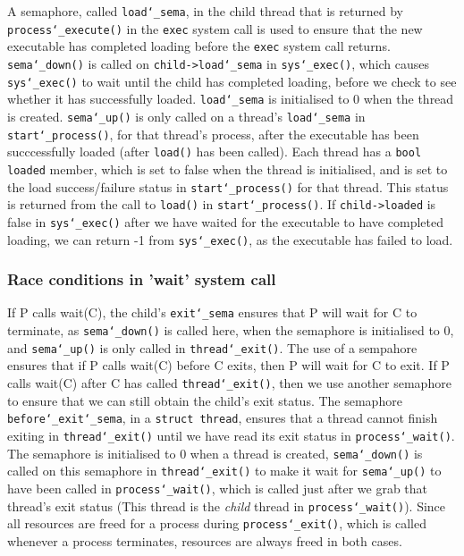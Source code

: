 \documentclass{article}
\renewcommand{\_}{\char`_}
\begin{document}
A semaphore, called \texttt{load\_sema}, in the child thread that is returned by \texttt{process\_execute()} in the \texttt{exec} system call is used to ensure that the new executable has completed loading before the \texttt{exec} system call returns. \texttt{sema\_down()} is called on \texttt{child->load\_sema} in \texttt{sys\_exec()}, which causes \texttt{sys\_exec()} to wait until the child has completed loading, before we check to see whether it has successfully loaded. \texttt{load\_sema} is initialised to 0 when the thread is created. \texttt{sema\_up()} is only called on a thread's \texttt{load\_sema} in \texttt{start\_process()}, for that thread's process, after the executable has been succcessfully loaded (after \texttt{load()} has been called). Each thread has a \texttt{bool loaded} member, which is set to false when the thread is initialised, and is set to the load success/failure status in \texttt{start\_process()} for that thread. This status is returned from the call to \texttt{load()} in \texttt{start\_process()}. If \texttt{child->loaded} is false in \texttt{sys\_exec()} after we have waited for the executable to have completed loading, we can return -1 from \texttt{sys\_exec()}, as the executable has failed to load.

\subsubsection{Race conditions in 'wait' system call}

If P calls wait(C), the child's \texttt{exit\_sema} ensures that P will wait for C to terminate, as \texttt{sema\_down()} is called here, when the semaphore is initialised to 0, and \texttt{sema\_up()} is only called in \texttt{thread\_exit()}. The use of a sempahore ensures that if P calls wait(C) before C exits, then P will wait for C to exit. If P calls wait(C) after C has called \texttt{thread\_exit()}, then we use another semaphore to ensure that we can still obtain the child's exit status. The semaphore \texttt{before\_exit\_sema}, in a \texttt{struct thread}, ensures that a thread cannot finish exiting in \texttt{thread\_exit()} until we have read its exit status in \texttt{process\_wait()}. The semaphore is initialised to 0 when a thread is created, \texttt{sema\_down()} is called on this semaphore in \texttt{thread\_exit()} to make it wait for \texttt{sema\_up()} to have been called in \texttt{process\_wait()}, which is called just after we grab that thread's exit status (This thread is the \textit{child} thread in \texttt{process\_wait()}). Since all resources are freed for a process during \texttt{process\_exit()}, which is called whenever a process terminates, resources are always freed in both cases.
\end{document}
